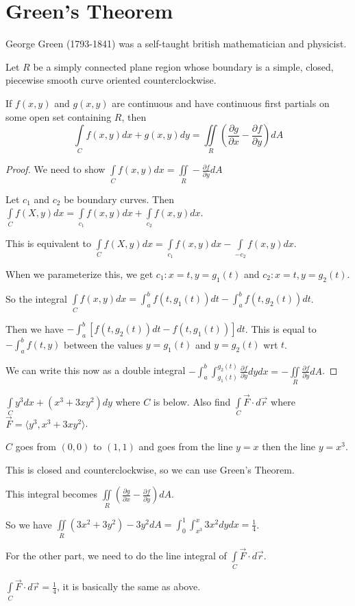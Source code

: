 \documentclass[../calc3.tex]{subfiles}
\begin{document}
\section{Green's Theorem}
George Green (1793-1841) was a self-taught british mathematician and physicist.

\begin{theorem}
    Let $R$ be a simply connected plane region whose boundary is a simple, closed, piecewise smooth curve oriented counterclockwise.

    If $f(x,y)$ and $g(x,y)$ are continuous and have continuous first partials on some open set containing $R$, then 
    \[ \int\limits_{C}f(x,y)dx+g(x,y)dy = \iint\limits_{R}\left(\frac{\partial g}{\partial x}-\frac{\partial f}{\partial y}\right)dA \]
\end{theorem}
\begin{proof}
    We need to show $\int\limits_{C}f(x,y)dx = \iint\limits_{R}-\frac{\partial f}{\partial y}dA$

    Let $c_1$ and $c_2$ be boundary curves. Then $\int\limits_{C}f(X,y)dx=\int\limits_{c_1}f(x,y)dx+\int\limits_{c_2}f(x,y)dx$.

    This is equivalent to $\int\limits_{C}f(X,y)dx=\int\limits_{c_1}f(x,y)dx-\int\limits_{-c_2}f(x,y)dx$.

    When we parameterize this, we get $c_1: x=t, y=g_1(t)$ and $c_2: x=t, y=g_2(t)$.

    So the integral $\int\limits_{C}f(x,y)dx = \int_a^b f(t,g_1(t))dt - \int_a^b f(t,g_2(t))dt$.

    Then we have $-\int_a^b [f(t,g_2(t))dt-f(t,g_1(t))]dt$. This is equal to $-\int_a^b f(t,y)$ between the values $y=g_1(t)$ and $y=g_2(t)$ wrt $t$.

    We can write this now as a double integral $-\int_a^b \int_{g_1(t)}^{g_2(t)}\frac{\partial f}{\partial y}dy dx = -\iint\limits_{R}\frac{\partial f}{\partial y}dA$.
\end{proof}

\pagebreak
\begin{example}
    $\int\limits_{C}y^3 dx + (x^3+3xy^2)dy$ where $C$ is below. Also find $\int\limits_{C}\vec{F}\cdot d\vec{r}$ where $\vec{F}=\langle y^3,x^3+3xy^2\rangle$.

    $C$ goes from $(0,0)$ to $(1,1)$ and goes from the line $y=x$ then the line $y=x^3$.

    This is closed and counterclockwise, so we can use Green's Theorem.

    This integral becomes $\iint\limits_{R}\left(\frac{\partial g}{\partial x}-\frac{\partial f}{\partial y}\right)dA$.

    So we have $\iint\limits_{R}(3x^2+3y^2)-3y^2 dA = \int_0^1 \int_{x^3}^x 3x^2 dy dx = \frac{1}{4}$.

    For the other part, we need to do the line integral of $\int\limits_{C}\vec{F}\cdot d\vec{r}$.

    $\int\limits_{C}\vec{F}\cdot d\vec{r}=\frac{1}{4}$, it is basically the same as above.
\end{example}
\end{document}
